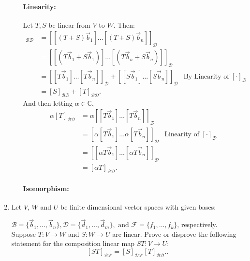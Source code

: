 \documentclass{article}
\begin{document}
\begin{enumerate}
\begin{enumerate}
          \paragraph{Linearity: }Let $T,S$ be linear from $V$ to $W$. Then:
          \begin{align*}
              [T+S]_{\mathcal{B}\mathcal{D}}&= \left[ [(T+S)\vec{b}_1]\ldots [(T+S)\vec{b}_n] \right] _\mathcal{D}\\
               &= \left[ [(T\vec{b}_1+S\vec{b}_1)]\ldots [(T\vec{b}_n+S\vec{b}_n)] \right]_\mathcal{D} \\
               &= \left[ [T\vec{b}_1]\ldots [T\vec{b}_n] \right] _\mathcal{D}+ \left[ [S\vec{b}_1]\ldots [S\vec{b}_n] \right] _\mathcal{D}&\text{By Linearity of }[\cdot]_\mathcal{D}\\
               &=  [S]_{\mathcal{B}\mathcal{D}} +[T]_{\mathcal{B}\mathcal{D}} 
          .\end{align*}
          And then letting $\alpha\in \mathbb{C}$,
           \begin{align*}
               \alpha[T]_{\mathcal{B}\mathcal{D}}&=\alpha\left[ [T\vec{b}_1]\ldots[T\vec{b}_n] \right] _\mathcal{D}\\
                         &=\left[ \alpha[T\vec{b}_1]\ldots\alpha[T\vec{b}_n] \right]_\mathcal{D} &\text{Linearity of }[\cdot]_{\mathcal{D}} \\
                         &=\left[ [\alpha T\vec{b}_1]\ldots[\alpha T\vec{b}_n]\right] _\mathcal{D} \\
               &= [\alpha T]_{\mathcal{B}\mathcal{D}} 
          .\end{align*}
          \paragraph{Isomorphism: } %
      \end{enumerate}
    \item Let $V$, $W$ and $U$ be finite dimensional vector spaces with given bases: 

        $\mathcal{B} = \{\vec{b}_1,\ldots,\vec{b}_n\}, \mathcal{D} = \{\vec{d}_1,\ldots,\vec{d}_m\}, \text{ and } \mathcal{F} = \{f_1,\ldots,f_k\}$, respectively. Suppose $T : V \to W$ and $S : W \to U$ are linear. Prove or disprove the following statement for the composition linear map  $ST : V \to U$:
      \[
      [ST]_{\mathcal{B}\mathcal{F}}=[S]_{\mathcal{DF}}[T]_{\mathcal{B}\mathcal{D}}.
      .\] 

\end{enumerate}
\end{document}
